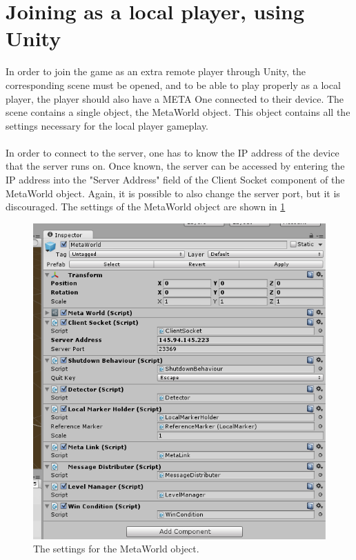 \documentclass[]{report}
\begin{document}
\section*{Joining as a local player, using Unity}
In order to join the game as an extra remote player through Unity, the 
corresponding scene must be opened, and to be able
to play properly as a local player, the player should also have a META One
connected to their device. The scene contains a single object, the MetaWorld object. This object
contains all the settings necessary for the local player gameplay.\\
\\
In order to connect to the server, one has to know the IP address of the
device that the server runs on. Once known, the server can be accessed by
entering the IP address into the "Server Address" field of the Client Socket
component of the MetaWorld object. Again, it is possible to also change the
server port, but it is discouraged. The settings of the MetaWorld object
are shown in \ref{fig:metaworld}

\begin{figure}[!ht]
    \centering
    \includegraphics[scale = 0.6]{MetaWorld}
    \caption{The settings for the MetaWorld object.}
    \label{fig:metaworld}
\end{figure}
\end{document}
